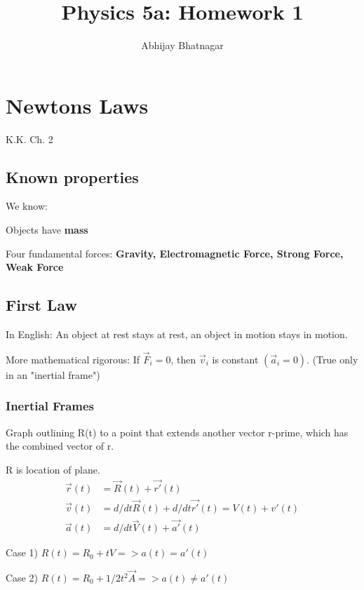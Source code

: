 \documentclass[11pt, notitlepage]{report}
\makeatletter
\newcommand{\ora}[1]{\overrightarrow{#1}}
\newcommand*{\toccontents}{\@starttoc{toc}}
\makeatother
\begin{document}
   \title{Physics 5a: Homework 1}
   \author{Abhijay Bhatnagar}
   \maketitle
   \toccontents



\setcounter{secnumdepth}{0} %
\section{Newtons Laws}

K.K. Ch. 2

\subsection{Known properties}

We know:

Objects have \textbf{mass}

Four fundamental forces:
\textbf{Gravity, Electromagnetic Force, Strong Force, Weak Force}

\subsection{First Law}

In English: An object at rest stays at rest, an object in motion stays in motion.

More mathematical rigorous: If $\ora{F}_i=0$, then $\ora{v}_i$ is constant $(\ora{a}_i=0)$. (True only in an "inertial frame")


\subsubsection{Inertial Frames}

Graph outlining R(t) to a point that extends another vector r-prime, which has the combined vector of r.

R is location of plane.
\begin{align*}
\ora{r}(t) &= \ora{R}(t)+\ora{r'}(t)  \\
\ora{v}(t) &= d/dt\ora{R}(t)+d/dt\ora{r'}(t) = V(t) + v'(t) \\
\ora{a}(t) &= d/dt\ora{V}(t)+\ora{a'}(t) 
\end{align*}

Case 1) $R(t) = R_0+tV => a(t) = a'(t)$

Case 2) $R(t) = R_0 + 1/2t^2 \ora{A}
=> a(t) \neq a'(t)$
\end{document}
